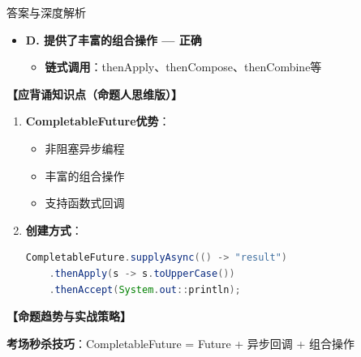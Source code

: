 \documentclass[12pt, a4paper]{ctexart}
\begin{document}
\begin{enumerate}[label=\textbf{\arabic*.}]
\begin{bluebox}{答案与深度解析}
\begin{itemize}[label={}, leftmargin=*, nosep]
		      \item \textbf{D. 提供了丰富的组合操作 — 正确}
		      \begin{itemize}[label={}, leftmargin=*, nosep]
			      \item \textbf{链式调用}：thenApply、thenCompose、thenCombine等
		      \end{itemize}

		      \end{itemize}

		      \textbf{【应背诵知识点（命题人思维版）】}
		      \begin{enumerate}[label={}, leftmargin=*, nosep]
			      \item \textbf{CompletableFuture优势}：
			            \begin{itemize}[label={}, nosep]
				            \item 非阻塞异步编程
				            \item 丰富的组合操作
				            \item 支持函数式回调
			            \end{itemize}

			      \item \textbf{创建方式}：
			            \begin{lstlisting}[language=Java]
CompletableFuture.supplyAsync(() -> "result")
    .thenApply(s -> s.toUpperCase())
    .thenAccept(System.out::println);
    \end{lstlisting}
		      \end{enumerate}

		      \textbf{【命题趋势与实战策略】}

		      \textbf{考场秒杀技巧}：CompletableFuture = Future + 异步回调 + 组合操作
	      \end{bluebox}

\end{enumerate}
\end{document}
